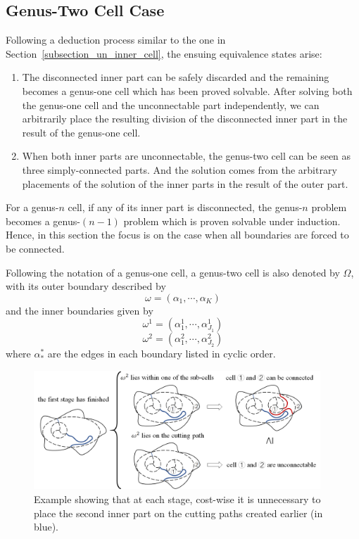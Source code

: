 \documentclass[Afour,sageh,times]{sagej}
\begin{document}
\subsection{Genus-Two Cell Case}
Following a deduction process similar to the one in Section~\ref{subsection_un_inner_cell}, the ensuing equivalence states arise:
\begin{enumerate}
\item The disconnected inner part can be safely discarded and the remaining becomes a genus-one cell which has been proved solvable. 
After solving both the genus-one cell and the unconnectable part independently, we can arbitrarily place the resulting division of the 
disconnected inner part in the result of the genus-one cell. 
\item When both inner parts are unconnectable, the genus-two cell can be seen as three simply-connected parts. And the solution comes from the arbitrary placements of the solution of the inner parts in the result of the outer part. 
\end{enumerate}

For a genus-$n$ cell, if any of its inner part is disconnected, the genus-$n$ problem becomes a genus-$(n-1)$ problem which is proven solvable under induction. Hence, in this section the focus is on the case when all boundaries are forced to be connected. 

Following the notation of a genus-one cell, a genus-two cell is also denoted by $\Omega$, with its outer boundary described by 
\begin{equation}
\label{equ_omega_genus_two}
\omega = (\alpha_1, \cdots, \alpha_K)
\end{equation}
and the inner boundaries given by
\begin{equation}
\label{equ_omega_genus_two_1}
\omega^1 = (\alpha^1_1, \cdots, \alpha^1_{J_1})
\end{equation}
\begin{equation}
\label{equ_omega_genus_two_2}
\omega^2 = (\alpha^2_1, \cdots, \alpha^2_{J_2})
\end{equation}
where $\alpha_*^*$ are the edges in each boundary listed in cyclic order. 

\begin{figure}[t]
\centering
\includegraphics[width = 0.96\textwidth]{figures/RSS_related_figures/proof/fig_no_on_cutting_path}
\caption{Example showing that at each stage, cost-wise it is unnecessary to place the second inner part on the 
cutting paths created earlier (in blue).}
\label{fig_no_on_cutting_path}
\end{figure}
\end{document}
